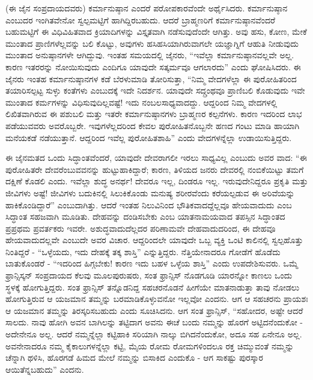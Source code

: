 (ಈ ಜೈನ ಸಂಪ್ರದಾಯದವರು) ಕರ್ಮಾನುಷ್ಠಾನ ಎಂದರೆ ಪರೋಪಕಾರವೆಂದೇ ಅರ್ಥೈಸಿದರು. ಕರ್ಮಾನುಷ್ಠಾನ ಎಂಬುದರ ಇಂಗಿತವೇನೋ ಸ್ವಲ್ಪಮಟ್ಟಿಗೆ ಹಾಗಿದ್ದಿರಬಹುದು. ಆದರೆ ಬ್ರಾಹ್ಮಣರಿಗೆ ಕರ್ಮಾನುಷ್ಠಾನವೆಂದರೆ ಬಹುಮಟ್ಟಿಗೆ ಈ ವಿಧಿವಿಹಿತವಾದ ಕ್ರಿಯಾದಿಗಳನ್ನು ವಿಸ್ತೃತವಾಗಿ ನಡೆಸುವುದೆಂದೇ ಆಗಿತ್ತು. ಅವು ಹಸು, ಕೋಣ, ಮೇಕೆ ಮುಂತಾದ ಪ್ರಾಣಿಗಳೆಲ್ಲವನ್ನು ಬಲಿ ಕೊಟ್ಟು, ಅವುಗಳು ಹಸಿಹಸಿಯಾಗಿರುವಾಗಲೇ ಯಜ್ಞಾಗ್ನಿಗೆ ಆಹುತಿ ನೀಡುವುದು ಮುಂತಾದ ಅನುಷ್ಠಾನಗಳೇ ಆಗಿದ್ದುವು. ಇಂತಹ ಸಮಯದಲ್ಲಿ ಜೈನರು, “ಇವೆಲ್ಲಾ ಕರ್ಮಾನುಷ್ಠಾನವಲ್ಲವೇ ಅಲ್ಲ. ಕಾರಣ ಇತರರನ್ನು ನೋಯಿಸುವುದು ಎಂದಿಗೂ ಯಾವುದೇ ಸತ್ಕರ್ಮವೂ ಆಗಲಾರದು” ಎಂದು ಘೋಷಿಸಿದರು. ಈ ಜೈನರು ಇಂತಹ ಕರ್ಮಾನುಷ್ಠಾನಗಳ ಕಡೆ ಬೆರಳುಮಾಡಿ ತೋರಿಸುತ್ತಾ, “ನಿಮ್ಮ ವೇದಗಳೆಲ್ಲಾ ಈ ಪುರೋಹಿತರಿಂದ ತಯಾರಿಸಲ್ಪಟ್ಟ ಸುಳ್ಳು ಕಂತೆಗಳು ಎಂಬುದಕ್ಕೆ ಇದೇ ನಿದರ್ಶನ. ಯಾವುದೇ ಸದ್ಗ್ರಂಥವೂ ಪ್ರಾಣಿಬಲಿ ಕೊಡುವುದು ಇವೇ ಮುಂತಾದ ಕರ್ಮಗಳನ್ನು ವಿಧಿಸುವುದಿಲ್ಲವಷ್ಟೆ! ಇದು ನಂಬಲಸಾಧ್ಯವಾದದ್ದು. ಆದ್ದರಿಂದ ನಿಮ್ಮ ವೇದಗಳಲ್ಲಿ ಲಿಖಿತವಾಗಿರುವ ಈ ಪಶುಬಲಿ ಮತ್ತು ಇತರೇ ಕರ್ಮಾನುಷ್ಠಾನಗಳು ಬ್ರಾಹ್ಮಣರ ಕಲ್ಪನೆಗಳು. ಕಾರಣ ಇದರಿಂದ ಲಾಭ ಪಡೆಯುವವರು ಅವರೊಬ್ಬರೇ. ಇವುಗಳೆಲ್ಲದರಿಂದ ಕೇವಲ ಪುರೋಹಿತನೊಬ್ಬನೇ ಹಣದ ಗಂಟು ಮಾಡಿ ಹಾಯಾಗಿ ಮನೆಯಕಡೆ ನಡೆಯುತ್ತಾನೆ. ಆದ್ದರಿಂದ ಇವೆಲ್ಲ ಪುರೋಹಿತಶಾಹಿ” ಎಂದು ವೇದಗಳನ್ನೆಲ್ಲಾ ಉಡಾಯಿಸುತ್ತಿದ್ದರು.

ಈ ಜೈನಮತದ ಒಂದು ಸಿದ್ಧಾಂತವೆಂದರೆ, ಯಾವುದೇ ದೇವರಾಗಲೀ ಇರಲು ಸಾಧ್ಯವಿಲ್ಲ ಎಂಬುದು ಅವರ ವಾದ: “ಈ ಪುರೋಹಿತರೇ ದೇವರೆಂಬುವವನನ್ನು ಹುಟ್ಟುಹಾಕಿದ್ದಾರೆ; ಕಾರಣ, ತಿಳಿಯದ ಜನರು ದೇವರಲ್ಲಿ ನಂಬಿಕೆಯಿಟ್ಟು ತಮಗೆ ದಕ್ಷಿಣೆ ಕೊಡಲಿ ಎಂದು. ಇವೆಲ್ಲಾ ಶುದ್ಧ ಅನರ್ಥ! ದೇವರೂ ಇಲ್ಲ, ದಿಂಡರೂ ಇಲ್ಲ. ಇರುವುದೇನಿದ್ದರೂ ಪ್ರಕೃತಿ ಮತ್ತು ಜೀವಿಗಳು ಅಷ್ಟೆ! ಜೀವಿಗಳು ಬದುಕಿನಲ್ಲಿ ಸಿಲುಕಿಕೊಂಡು ಮನುಷ್ಯ ಶರೀರವೆಂದು ಕರೆಯಲ್ಪಡುವ ಈ ಅರಿವೆಯನ್ನು ಹಾಕಿಕೊಂಡಿದ್ದಾರೆ” ಎಂಬುದಾಗಿತ್ತು. ಆದರೆ ಇಂತಹ ನಿಲುವಿನಿಂದ ಭೌತಿಕವಾದದ್ದೆಲ್ಲವೂ ಹೇಯವಾದುದು ಎಂಬ ಸಿದ್ಧಾಂತ ಸಹಜವಾಗಿ ಮೂಡಿತು. ದೇಹವನ್ನು ದಂಡಿಸಬೇಕು ಎಂಬ ಯಾತನಾಮಯವಾದ ತಪಸ್ಸಿನ ಸಿದ್ಧಾಂತದ ಪ್ರಪ್ರಥಮ ಪ್ರವರ್ತಕರು ಇವರೇ. ಅಶುದ್ಧವಾದುದೆಲ್ಲದರ ಪರಿಣಾಮವೇ ದೇಹವಾದುದರಿಂದ, ಈ ದೇಹವೂ ಹೇಯವಾದುದಲ್ಲವೇ ಎಂಬುದೇ ಅವರ ವಿಚಾರ. ಆದ್ದರಿಂದಲೇ ಯಾವುದೇ ಒಬ್ಬ ವ್ಯಕ್ತಿ ಒಂಟಿ ಕಾಲಿನಲ್ಲಿ ಸ್ವಲ್ಪಹೊತ್ತು ನಿಂತಿದ್ದರೆ - “ಒಳ್ಳೆಯದು, ಇದು ದೇಹಕ್ಕೆ ತಕ್ಕ ಶಾಸ್ತಿ” ಎನ್ನುತ್ತಿದ್ದರು. ನೆತ್ತಿಯೇನಾದರೂ ಗೋಡೆಗೆ ಹೊಡೆದು ಬಾತುಕೊಂಡರೆ - “ಇದರಿಂದ ಹಿಗ್ಗಬೇಕು! ಕಾರಣ ಇದು ಬಹಳ ಒಳ್ಳೆಯ ಶಾಸ್ತಿ” ಎಂದು ಉಪದೇಶಿಸುವರು. ಒಮ್ಮೆ ಫ್ರಾನ್ಸಿಸ್ಕನ್ ಸಂಪ್ರದಾಯದ ಕೆಲವು ಮೂಲಪುರುಷರು, ಸಂತ ಫ್ರಾನ್ಸಿಸ್ ನೊಡಗೂಡಿ ಯಾರನ್ನೋ ಕಾಣಲು ಒಂದು ಸ್ಥಳಕ್ಕೆ ಹೋಗುತ್ತಿದ್ದರು. ಸಂತ ಫ್ರಾನ್ಸಿಸ್ ತನ್ನೊಡನಿದ್ದ ಸಹಚರನೊಡನೆ ಹೀಗೆಯೇ ಮಾತನಾಡುತ್ತಾ ತಾವು ನೋಡಲು ಹೋಗುತ್ತಿರುವ ಆ ಯಜಮಾನ ತಮ್ಮನ್ನು ಬರಮಾಡಿಕೊಳ್ಳುವನೋ ಇಲ್ಲವೋ ಎಂದನು. ಆಗ ಆ ಸಹಚರನು ಪ್ರಾಯಶಃ ಆ ಯಜಮಾನ ತಮ್ಮನ್ನು ತಿರಸ್ಕರಿಸಬಹುದು ಎಂದು ಸೂಚಿಸಿದನು. ಆಗ ಸಂತ ಫ್ರಾನ್ಸಿಸ್, “ಸಹೋದರ, ಅಷ್ಟೇ ಆದರೆ ಸಾಲದು. ನಾವು ಹೋಗಿ ಅವನ ಬಾಗಿಲನ್ನು ತಟ್ಟಿದಾಗ ಅವನು ಈಚೆ ಬಂದು ನಮ್ಮನ್ನು ಹೊರಗೆ ಅಟ್ಟಿದನೆಂದುಕೋ - ಅದೇನೇನೂ ಅಲ್ಲ. ಆದರೆ ನಮ್ಮನ್ನೆಲ್ಲಾ ಕಟ್ಟಿಹಾಕಿ ಸರಿಯಾಗಿ ನಾಲ್ಕು ಬಿಗಿದನೆಂದುಕೋ, ಅದೂ ಸಹ ಏನೇನೂ ಅಲ್ಲ. ಅವನೇನಾದರೂ ನಮ್ಮ ಕೈಕಾಲುಗಳನ್ನೆಲ್ಲಾ ಕಟ್ಟಿ, ಮೈಯ ರೋಮ ರೋಮಗಳಿಂದಲೂ ರಕ್ತ ಚಿಮ್ಮುವಂತೆ ನಮ್ಮನ್ನು ಚೆನ್ನಾಗಿ ಥಳಿಸಿ, ಹೊರಗಡೆ ಹಿಮದ ಮೇಲೆ ನಮ್ಮನ್ನು ಬಿಸಾಕಿದ ಎಂದುಕೊ - ಆಗ ಸಾಕಷ್ಟು ಪುರಸ್ಕಾರ ಆಯಿತೆನ್ನಬಹುದು” ಎಂದನು.

